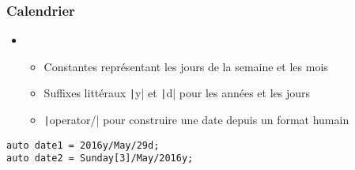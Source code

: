 \documentclass[C++.tex]{subfiles}
\begin{document}
\begin{frame}[fragile]
	\frametitle{Calendrier}
	\begin{itemize}
		\item [] \begin{itemize}
			\item Constantes représentant les jours de la semaine et les mois
			\item Suffixes littéraux \texttt|y| et \texttt|d| pour les années et les jours
			\item \texttt|operator/| pour construire une date depuis un format humain
		\end{itemize}
	\end{itemize}

	\begin{verbatim}
auto date1 = 2016y/May/29d;
auto date2 = Sunday[3]/May/2016y;
	\end{verbatim}

\end{frame}
\end{document}
